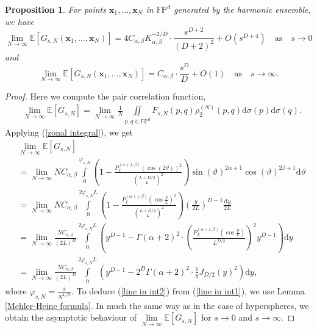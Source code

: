 \documentclass[a4paper,11pt]{amsart}
\newtheorem{prop}{Proposition}
\begin{document}
\begin{prop}\label{harmonic hyper proposition}
 For points $\mathbf{x}_1,\dots,\mathbf{x}_N$ in $\mathbb{FP}^d$ generated by the harmonic ensemble, we have
 \begin{equation*}
     \lim\limits_{N\rightarrow\infty}\mathbb{E}[G_{s,N}(\mathbf{x}_1,\dots,\mathbf{x}_N)]=4C_{\alpha,\beta}K_{\alpha,\beta}^{-2/D}\cdot \frac{s^{D+2}}{(D+2)^2}+O(s^{D+4})\quad\text{as}\quad s\rightarrow 0
\end{equation*}
and 
\begin{equation*}
     \lim\limits_{N\rightarrow\infty}\mathbb{E}[G_{s,N}(\mathbf{x}_1,\dots,\mathbf{x}_N)]=C_{\alpha,\beta}\cdot\frac{s^D}{D}+O(1)\quad\text{as}\quad s\rightarrow\infty.
\end{equation*}

\end{prop}
\begin{proof}
Here we compute the pair correlation function,
\begin{align*}
     &\lim\limits_{N\rightarrow \infty}  \mathbb{E}[G_{s,N}]=\lim\limits_{N\rightarrow \infty}\frac{1}{N}\iint\limits_{p,q\in\mathbb{FP}^d}F_{s,N}(p,q)\rho_2^{(N)}(p,q)\mathrm{d}\sigma(p)\mathrm{d}\sigma(q).
\end{align*}
Applying (\ref{zonal integral}), we get
\begin{align}
  &\lim\limits_{N\rightarrow \infty}  \mathbb{E}[G_{s,N}] \nonumber
    \\ &=\lim\limits_{N\rightarrow \infty}NC_{\alpha,\beta}\int\limits_{0}^{\varphi_{s,N}}\left(1-\frac{P_L^{(\alpha+1,\beta)}(\cos(2\vartheta))^2}{\binom{L+D/2}{L}^2}\right)\sin(\vartheta)^{2\alpha+1}\cos(\vartheta)^{2\beta+1}\mathrm{d}\vartheta \nonumber
    \\ &=\lim\limits_{N\rightarrow \infty} NC_{\alpha,\beta}\int\limits_0^{2\varphi_{s,N}L}\left(1-\frac{P_L^{(\alpha+1,\beta)}\left(\cos \frac{y}{L} \right)^2}{\binom{L+D/2}{L}^2}\right)\left(\frac{y}{2L}\right)^{D-1}\frac{\mathrm{d}y}{2L} \nonumber
    \\ &=\lim\limits_{N\rightarrow \infty} \frac{N C_{\alpha,\beta}}{(2L)^D }\int\limits_0^{2\varphi_{s,N}L}\left(y^{D-1}-\Gamma\left(\alpha+2\right)^2\cdot\left(\frac{P_L^{(\alpha+1,\beta)}\left(\cos \frac{y}{L} \right)}{L^{D/2}}\right)^2 y^{D-1}\right)\mathrm{d}y \label{line in int1}
    \\ &=\lim\limits_{N\rightarrow \infty} \frac{N C_{\alpha,\beta}}{(2L)^D }\int\limits_0^{2\varphi_{s,N}L}\left(y^{D-1}-2^D\Gamma\left(\alpha+2\right)^2\cdot\frac{1}{y}J_{D/2}(y)^2\right)\mathrm{d}y, \label{line in int2}
    \end{align}
    where $\varphi_{s,N}=\frac{s}{N^{1/D}}$. To deduce (\ref{line in int2}) from (\ref{line in int1}), we use Lemma \ref{Mehler-Heine formula}. In much the same way as in the case of hyperspheres,  we obtain the asymptotic behaviour of $ \lim\limits_{N\rightarrow\infty}\mathbb{E}[G_{s,N}]$ for $s\rightarrow0$ and $s\rightarrow\infty$. 
\end{proof}
\end{document}
